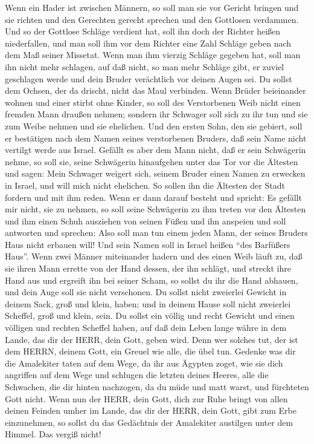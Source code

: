  Wenn ein Hader ist zwischen Männern, so soll man sie vor
Gericht bringen und sie richten und den Gerechten gerecht sprechen und
den Gottlosen verdammen.  Und so der Gottlose Schläge
verdient hat, soll ihn doch der Richter heißen niederfallen, und man
soll ihm vor dem Richter eine Zahl Schläge geben nach dem Maß seiner
Missetat.  Wenn man ihm vierzig Schläge gegeben hat, soll
man ihn nicht mehr schlagen, auf daß nicht, so man mehr Schläge gibt, er
zuviel geschlagen werde und dein Bruder verächtlich vor deinen Augen
sei.  Du sollst dem Ochsen, der da drischt, nicht das Maul
verbinden.  Wenn Brüder beieinander wohnen und einer stirbt
ohne Kinder, so soll des Verstorbenen Weib nicht einen fremden Mann
draußen nehmen; sondern ihr Schwager soll sich zu ihr tun und sie zum
Weibe nehmen und sie ehelichen.  Und den ersten Sohn, den
sie gebiert, soll er bestätigen nach dem Namen seines verstorbenen
Bruders, daß sein Name nicht vertilgt werde aus Israel. 
Gefällt es aber dem Mann nicht, daß er sein Schwägerin nehme, so soll
sie, seine Schwägerin hinaufgehen unter das Tor vor die Ältesten und
sagen: Mein Schwager weigert sich, seinem Bruder einen Namen zu erwecken
in Israel, und will mich nicht ehelichen.  So sollen ihn die
Ältesten der Stadt fordern und mit ihm reden. Wenn er dann darauf
besteht und spricht: Es gefällt mir nicht, sie zu nehmen, 
so soll seine Schwägerin zu ihm treten vor den Ältesten und ihm einen
Schuh ausziehen von seinen Füßen und ihn anspeien und soll antworten und
sprechen: Also soll man tun einem jeden Mann, der seines Bruders Haus
nicht erbauen will!  Und sein Namen soll in Israel heißen
``des Barfüßers Haus''.  Wenn zwei Männer miteinander
hadern und des einen Weib läuft zu, daß sie ihren Mann errette von der
Hand dessen, der ihn schlägt, und streckt ihre Hand aus und ergreift ihn
bei seiner Scham,  so sollst du ihr die Hand abhauen, und
dein Auge soll sie nicht verschonen.  Du sollst nicht
zweierlei Gewicht in deinem Sack, groß und klein, haben; 
und in deinem Hause soll nicht zweierlei Scheffel, groß und klein, sein.
 Du sollst ein völlig und recht Gewicht und einen völligen
und rechten Scheffel haben, auf daß dein Leben lange währe in dem Lande,
das dir der HERR, dein Gott, geben wird.  Denn wer solches
tut, der ist dem HERRN, deinem Gott, ein Greuel wie alle, die übel tun.
 Gedenke was dir die Amalekiter taten auf dem Wege, da ihr
aus Ägypten zoget,  wie sie dich angriffen auf dem Wege und
schlugen die letzten deines Heeres, alle die Schwachen, die dir hinten
nachzogen, da du müde und matt warst, und fürchteten Gott nicht.
 Wenn nun der HERR, dein Gott, dich zur Ruhe bringt von
allen deinen Feinden umher im Lande, das dir der HERR, dein Gott, gibt
zum Erbe einzunehmen, so sollst du das Gedächtnis der Amalekiter
austilgen unter dem Himmel. Das vergiß nicht!

